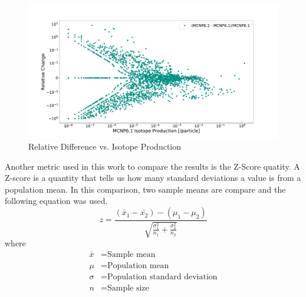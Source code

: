 \begin{figure}[h!]
        \centering
        \includegraphics[scale=0.4]{figs/reldiff_merbox_62_61.pdf}
	\caption{Relative Difference vs. Isotope Production}
        \label{fig:reldiff}
\end{figure}

Another metric used in this work to compare the results is the Z-Score quatity.
A Z-score
is a quantity that tells us how many standard deviations a value is from a
population
mean. In this comparison, two sample means are compare and the following
equation was used. 
\begin{equation}\label{eq:ztest}
        z = \frac{(\bar{x}_{1} - \bar{x_{2}}) - (\mu_{1} - \mu_{2}) }
            {\sqrt{\frac{\sigma_{1}^{2}}{n_{1}} + \frac{\sigma_{2}^{2}}{n_{2}} }}
\end{equation}
where
\begin{equation}
\begin{split}
        \bar{x} &= \text{Sample mean} \\
        \mu     &= \text{Population mean} \\
        \sigma  &= \text{Population standard deviation} \\
        n       &= \text{Sample size}
\end{split}
\end{equation}

